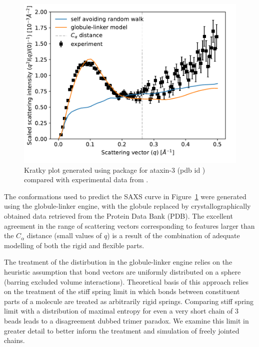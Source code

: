 \documentclass{doctoral}
\newcommand{\code}[1]{\texttt{\detokenize{#1}}}
\begin{document}
\begin{figure}[htbp]
    \centering
    \includegraphics[height=0.5\linewidth]{figures/saxs_single_bead.pdf}
    \caption{Kratky plot generated using \code{saxs_single_bead} package for {ataxin-3} (pdb id \code{1yzb}) compared with experimental data from \textcite{Sicorello_2021}.}
    \label{fig:saxs_compare}
\end{figure}

The conformations used to predict the SAXS curve in Figure~\ref{fig:saxs_compare} were generated using the globule-linker engine, with the globule replaced by crystallographically obtained data retrieved from the Protein Data Bank (PDB)\cite{rcsb_org}.
The excellent agreement in the range of scattering vectors corresponding to features larger than the $C_{\alpha}$ distance (small values of $q$) is a result of the combination of adequate modelling of both the rigid and flexible parts.

The treatment of the distirbution in the globule-linker engine relies on the heuristic assumption that bond vectors are uniformly distributed on a sphere (barring excluded volume interactions). 
Theoretical basis of this approach relies on the treatment of the stiff spring limit in which bonds between constituent parts of a molecule are treated as arbitrarily rigid springs. 
Comparing stiff spring limit with a distribution of maximal entropy for even a very short chain of 3 beads leads to a disagreement dubbed trimer paradox.
We examine this limit in greater detail to better inform the treatment and simulation of freely jointed chains.
\end{document}
